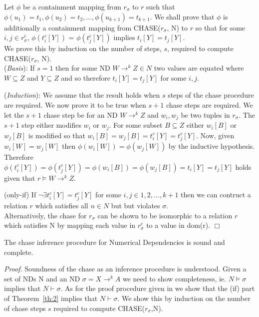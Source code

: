 \smallskip
Let $\phi$ be a containment mapping from $r_\sigma$ to $r$ such that
$\phi(u_1) = t_1, \phi(u_2) = t_2, \ldots, \phi(u_{k+1}) = t_{k+1}$. We
shall prove that $\phi$ is additionally a containment mapping from
CHASE($r_\sigma$, N) to $r$ so that for some $i,j \in r_\sigma^c$,
$\phi(t_i^c[Y])$ = $\phi(t_j^c[Y])$ implies $t_i[Y] = t_j[Y]$.\\
\smallskip
We prove this by induction on the number of steps, $s$, required to compute
CHASE($r_\sigma$, N).\\

({\em Basis}):
If $s = 1$ then for some ND $W \to^k Z \in N$ two values are equated 
where $W \subseteq Z$ and $Y \subseteq Z$ and so therefore 
$t_i[Y] = t_j[Y]$ for some $i,j$.
\smallskip
 
({\em Induction}):
We assume that the result holds when $s$ steps of the chase procedure
are required. We now prove it to be true when $s+1$ chase steps are
required. We let the $s+1$ chase step be for an ND $W \to^k Z$ and
$w_i, w_j$ be two tuples in $r_\sigma$. The $s+1$ step either modifies
$w_i$ or $w_j$. For some subset $B \subseteq Z$ either $w_i[B]$ or
$w_j[B]$ is modified so that $w_i[B] = w_j[B] = t_i^c[Y] = t_j^c[Y]$.
Now, given $w_i[W] = w_j[W]$ then $\phi(w_i[W]) = \phi(w_j[W])$ by the
inductive hypothesis.  Therefore $\phi(t_i^c[Y]) = \phi(t_j^c[Y]) =
\phi(w_i[B]) = \phi(w_j[B]) = t_i[Y] = t_j[Y]$ holds given that $r
\models W \to^k Z$.\\

\smallskip

(only-if) If $\neg\exists t_i^c[Y] = t_j^c[Y]$ for some $i,j \in {1,2,
\ldots, k+1}$ then we can contruct a relation $r$ which satisfies all
$n \in N$ but but violates $\sigma$. \\

\smallskip
Alternatively, the chase for $r_\sigma$ can be shown to be isomorphic
to a relation $r$ which satisfies N by mapping each value in
$r_\sigma^c$ to a value in dom(r). $\Box$


\begin{theorem}\label{th:3}
\begin{rm}
The chase inference procedure for Numerical Dependencies is sound and complete.\end{rm}
\end{theorem}

{\em Proof.} Soundness of the chase as an inference procedure is
understood. Given a set of NDs N and an ND $\sigma = X \to^k A$ we
need to show completeness, ie. $N \models \sigma$ implies that $N
\vdash \sigma$. As for the proof procedure given in \cite{ll97c} we show
that the (if) part of Theorem~\ref{th:2} implies that $N \vdash
\sigma$. We show this by induction on the number of chase steps $s$
required to compute CHASE($r_\sigma$,N).

